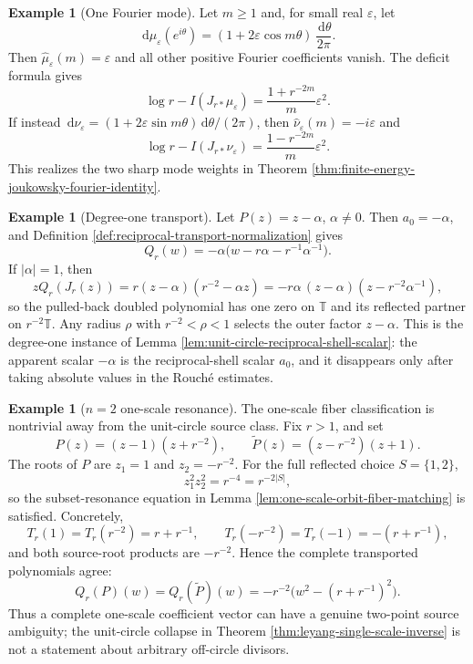 \documentclass[12pt,a4paper]{article}
\theoremstyle{plain}
\theoremstyle{definition}
\newtheorem{example}[theorem]{Example}
\numberwithin{equation}{section}
\newcommand{\TT}{\mathbb{T}}
\newcommand{\dd}{\,\mathrm{d}}
\begin{document}
\begin{example}[One Fourier mode]\label{ex:one-fourier-mode-deficit}
Let \(m\ge1\) and, for small real \(\varepsilon\), let
\[
\dd\mu_\varepsilon(e^{i\theta})=(1+2\varepsilon\cos m\theta)\,\frac{\dd\theta}{2\pi}.
\]
Then \(\widehat\mu_\varepsilon(m)=\varepsilon\) and all other positive Fourier coefficients vanish.  The deficit formula gives
\[
\log r-I(J_{r\ast}\mu_\varepsilon)=\frac{1+r^{-2m}}{m}\varepsilon^2.
\]
If instead \(\dd\nu_\varepsilon=(1+2\varepsilon\sin m\theta)\dd\theta/(2\pi)\), then \(\widehat\nu_\varepsilon(m)=-i\varepsilon\) and
\[
\log r-I(J_{r\ast}\nu_\varepsilon)=\frac{1-r^{-2m}}{m}\varepsilon^2.
\]
This realizes the two sharp mode weights in Theorem \ref{thm:finite-energy-joukowsky-fourier-identity}.
\end{example}

\begin{example}[Degree-one transport]\label{ex:degree-one-transport}
Let \(P(z)=z-\alpha\), \(\alpha\ne0\).  Then \(a_0=-\alpha\), and Definition \ref{def:reciprocal-transport-normalization} gives
\[
Q_r(w)=-\alpha\bigl(w-r\alpha-r^{-1}\alpha^{-1}\bigr).
\]
If \(|\alpha|=1\), then
\[
zQ_r(J_r(z))=r(z-\alpha)(r^{-2}-\alpha z)
=-r\alpha\,(z-\alpha)(z-r^{-2}\alpha^{-1}),
\]
so the pulled-back doubled polynomial has one zero on \(\TT\) and its reflected partner on \(r^{-2}\TT\).  Any radius \(\rho\) with \(r^{-2}<\rho<1\) selects the outer factor \(z-\alpha\).
This is the degree-one instance of Lemma
\ref{lem:unit-circle-reciprocal-shell-scalar}: the apparent scalar
\(-\alpha\) is the reciprocal-shell scalar \(a_0\), and it disappears
only after taking absolute values in the Rouch\'e estimates.
\end{example}

\begin{example}[\(n=2\) one-scale resonance]\label{ex:n2-one-scale-resonance}
The one-scale fiber classification is nontrivial away from the unit-circle source class.  Fix \(r>1\), and set
\[
P(z)=(z-1)(z+r^{-2}),\qquad
\widetilde P(z)=(z-r^{-2})(z+1).
\]
The roots of \(P\) are \(z_1=1\) and \(z_2=-r^{-2}\).  For the full reflected choice \(S=\{1,2\}\),
\[
z_1^2z_2^2=r^{-4}=r^{-2|S|},
\]
so the subset-resonance equation in Lemma \ref{lem:one-scale-orbit-fiber-matching} is satisfied.  Concretely,
\[
T_r(1)=T_r(r^{-2})=r+r^{-1},\qquad
T_r(-r^{-2})=T_r(-1)=-(r+r^{-1}),
\]
and both source-root products are \(-r^{-2}\).  Hence the complete transported polynomials agree:
\[
Q_r(P)(w)=Q_r(\widetilde P)(w)
=-r^{-2}\bigl(w^2-(r+r^{-1})^2\bigr).
\]
Thus a complete one-scale coefficient vector can have a genuine two-point source ambiguity; the unit-circle collapse in Theorem \ref{thm:leyang-single-scale-inverse} is not a statement about arbitrary off-circle divisors.
\end{example}
\end{document}
